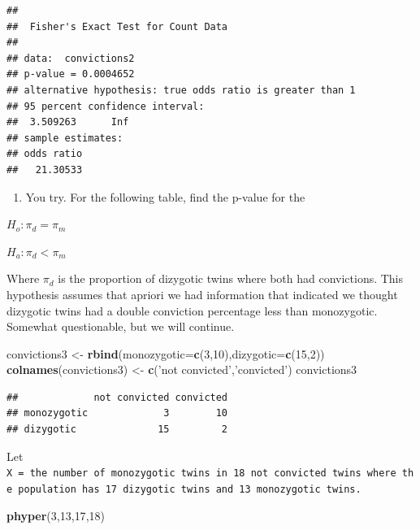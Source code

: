 \documentclass[]{book}
\newenvironment{Shaded}{\begin{snugshade}}{\end{snugshade}}
\newcommand{\KeywordTok}[1]{\textcolor[rgb]{0.13,0.29,0.53}{\textbf{#1}}}
\newcommand{\DataTypeTok}[1]{\textcolor[rgb]{0.13,0.29,0.53}{#1}}
\newcommand{\DecValTok}[1]{\textcolor[rgb]{0.00,0.00,0.81}{#1}}
\newcommand{\StringTok}[1]{\textcolor[rgb]{0.31,0.60,0.02}{#1}}
\newcommand{\NormalTok}[1]{#1}
\providecommand{\tightlist}{%
  \setlength{\itemsep}{0pt}\setlength{\parskip}{0pt}}
\theoremstyle{definition}
\theoremstyle{definition}
\theoremstyle{definition}
\theoremstyle{remark}
\begin{document}
\begin{verbatim}
## 
##  Fisher's Exact Test for Count Data
## 
## data:  convictions2
## p-value = 0.0004652
## alternative hypothesis: true odds ratio is greater than 1
## 95 percent confidence interval:
##  3.509263      Inf
## sample estimates:
## odds ratio 
##   21.30533
\end{verbatim}

\begin{enumerate}
\def\labelenumi{\arabic{enumi}.}
\setcounter{enumi}{2}
\tightlist
\item
  You try. For the following table, find the p-value for the
\end{enumerate}

\(H_o: \pi_{d}=\pi_{m}\)

\(H_a: \pi_{d} < \pi_{m}\)

Where \(\pi_{d}\) is the proportion of dizygotic twins where both had
convictions. This hypothesis assumes that apriori we had information
that indicated we thought dizygotic twins had a double conviction
percentage less than monozygotic. Somewhat questionable, but we will
continue.

\begin{Shaded}
\begin{Highlighting}[]
\NormalTok{convictions3 <-}\StringTok{ }\KeywordTok{rbind}\NormalTok{(}\DataTypeTok{monozygotic=}\KeywordTok{c}\NormalTok{(}\DecValTok{3}\NormalTok{,}\DecValTok{10}\NormalTok{),}\DataTypeTok{dizygotic=}\KeywordTok{c}\NormalTok{(}\DecValTok{15}\NormalTok{,}\DecValTok{2}\NormalTok{))}
\KeywordTok{colnames}\NormalTok{(convictions3) <-}\StringTok{ }\KeywordTok{c}\NormalTok{(}\StringTok{'not convicted'}\NormalTok{,}\StringTok{'convicted'}\NormalTok{)}
\NormalTok{convictions3}
\end{Highlighting}
\end{Shaded}

\begin{verbatim}
##             not convicted convicted
## monozygotic             3        10
## dizygotic              15         2
\end{verbatim}

Let
\texttt{X\ =\ the\ number\ of\ monozygotic\ twins\ in\ 18\ not\ convicted\ twins\ where\ the\ population\ has\ 17\ dizygotic\ twins\ and\ 13\ monozygotic\ twins.}

\begin{Shaded}
\begin{Highlighting}[]
\KeywordTok{phyper}\NormalTok{(}\DecValTok{3}\NormalTok{,}\DecValTok{13}\NormalTok{,}\DecValTok{17}\NormalTok{,}\DecValTok{18}\NormalTok{)}
\end{Highlighting}
\end{Shaded}
\end{document}
